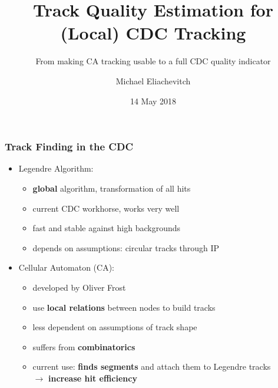\documentclass[18pt, aspectratio=169]{beamer}
\title{Track Quality Estimation for (Local) CDC Tracking}
\subtitle{From making CA tracking usable to a full CDC quality indicator}
\author{Michael Eliachevitch}
\date{14 May 2018}
\institute{ETP - KIT}
\newcommand{\greenbold}[1]{\textcolor{kit-green100}{\bf{#1}}}
\newcommand{\orangebold}[1]{\textcolor{kit-orange100}{\bf{#1}}}
\begin{document}

\begin{frame}
  \titlepage
\end{frame}

\begin{frame}
  \frametitle{Track Finding in the CDC}
  \begin{itemize}
  \item Legendre Algorithm:
    \begin{itemize}
    \item \greenbold{global} algorithm, transformation of all hits
    \item current CDC workhorse, works very well
    \item fast and stable against high backgrounds
    \item depends on assumptions: circular tracks through IP
    \end{itemize}
    \item Cellular Automaton (CA):
      \begin{itemize}
      \item developed by Oliver Frost
      \item use \greenbold{local relations} between nodes to build tracks
      \item less dependent on assumptions of track shape
      \item suffers from \greenbold{combinatorics}
      \item current use: \greenbold{finds segments} and attach them to Legendre tracks\\
        $\rightarrow$ \orangebold{increase hit efficiency}
      \end{itemize}
  \end{itemize}
\end{frame}
\end{document}
